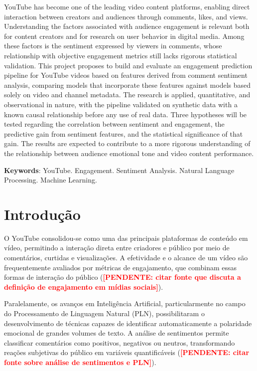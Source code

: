 \documentclass[12pt,a4paper]{article}
\newcommand{\pendente}[1]{\textcolor{red}{\textbf{[PENDENTE: #1]}}}
\begin{document}
YouTube has become one of the leading video content platforms, enabling direct interaction between creators and audiences through comments, likes, and views. Understanding the factors associated with audience engagement is relevant both for content creators and for research on user behavior in digital media. Among these factors is the sentiment expressed by viewers in comments, whose relationship with objective engagement metrics still lacks rigorous statistical validation. This project proposes to build and evaluate an engagement prediction pipeline for YouTube videos based on features derived from comment sentiment analysis, comparing models that incorporate these features against models based solely on video and channel metadata. The research is applied, quantitative, and observational in nature, with the pipeline validated on synthetic data with a known causal relationship before any use of real data. Three hypotheses will be tested regarding the correlation between sentiment and engagement, the predictive gain from sentiment features, and the statistical significance of that gain. The results are expected to contribute to a more rigorous understanding of the relationship between audience emotional tone and video content performance.

\vspace{0.5cm}
\noindent\textbf{Keywords}: YouTube. Engagement. Sentiment Analysis. Natural Language Processing. Machine Learning.

\newpage
\tableofcontents
\newpage

\section{Introdução}

O YouTube consolidou-se como uma das principais plataformas de conteúdo em vídeo, permitindo a interação direta entre criadores e público por meio de comentários, curtidas e visualizações. A efetividade e o alcance de um vídeo são frequentemente avaliados por métricas de engajamento, que combinam essas formas de interação do público (\pendente{citar fonte que discuta a definição de engajamento em mídias sociais}).

Paralelamente, os avanços em Inteligência Artificial, particularmente no campo do Processamento de Linguagem Natural (PLN), possibilitaram o desenvolvimento de técnicas capazes de identificar automaticamente a polaridade emocional de grandes volumes de texto. A análise de sentimentos permite classificar comentários como positivos, negativos ou neutros, transformando reações subjetivas do público em variáveis quantificáveis (\pendente{citar fonte sobre análise de sentimentos e PLN}).
\end{document}
